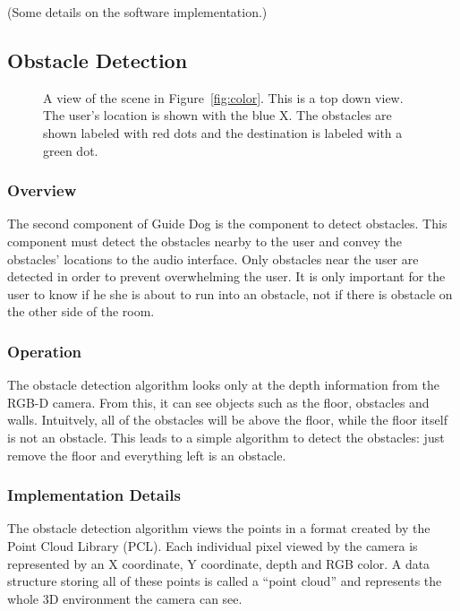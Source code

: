 (Some details on the software implementation.)

\subsection{Obstacle Detection}
\label{sec:obs}

\begin{figure}
\caption{A view of the scene in Figure~\ref{fig:color}. This is a top down view.
  The user's location is shown with the blue X. The obstacles are shown labeled
  with red dots and the destination is labeled with a green dot.}
\label{fig:obstacle}
\end{figure}

\subsubsection{Overview}
\label{sec:obs-overview}

The second component of Guide Dog is the component to detect obstacles. This
component must detect the obstacles nearby to the user and convey the obstacles'
locations to the audio interface. Only obstacles near the user are detected in
order to prevent overwhelming the user. It is only important for the user to
know if he she is about to run into an obstacle, not if there is obstacle on the
other side of the room.

\subsubsection{Operation}
\label{sec:obs-op}

The obstacle detection algorithm looks only at the depth information from the
RGB-D camera. From this, it can see objects such as the floor, obstacles and
walls. Intuitvely, all of the obstacles will be above the floor, while the floor
itself is not an obstacle. This leads to a simple algorithm to detect the
obstacles: just remove the floor and everything left is an obstacle.

\subsubsection{Implementation Details}
\label{sec:pbs-impl}

The obstacle detection algorithm views the points in a format created by the
Point Cloud Library (PCL)\cite{pcl-website}. Each individual pixel viewed by
the camera is represented by an X coordinate, Y coordinate, depth and RGB color.
A data structure storing all of these points is called a ``point cloud'' and
represents the whole 3D environment the camera can see.

